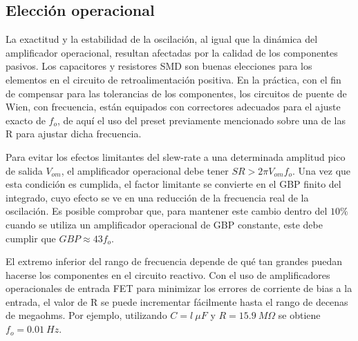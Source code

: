 \subsection{Elección operacional}
La exactitud y la estabilidad de la oscilación, al igual que la dinámica del amplificador operacional, resultan afectadas por la calidad de los componentes pasivos. Los capacitores y resistores SMD son buenas elecciones para los elementos en el circuito de retroalimentación positiva. En la práctica, con el fin de compensar para las tolerancias de los componentes, los circuitos de puente de Wien, con frecuencia, están equipados con correctores adecuados para el ajuste exacto de $f_o$, de aquí el uso del preset previamente mencionado sobre una de las R para ajustar dicha frecuencia.

Para evitar los efectos limitantes del slew-rate a una determinada amplitud pico de salida $V_{om}$, el amplificador operacional debe tener $SR > 2\pi V_{om} f_o$. Una vez que esta condición es cumplida, el factor limitante se convierte en el GBP finito del integrado, cuyo efecto se ve en una reducción de la frecuencia real de la oscilación. Es posible comprobar que, para mantener este cambio dentro del $10\%$ cuando se utiliza un amplificador operacional de GBP constante, este debe cumplir que $GBP \approx 43 f_o$.

El extremo inferior del rango de frecuencia depende de qué tan grandes puedan hacerse los componentes en el circuito reactivo. Con el uso de amplificadores operacionales de entrada FET para minimizar los errores de corriente de bias a la entrada, el valor de R se puede incrementar fácilmente hasta el rango de decenas de megaohms. Por ejemplo, utilizando $C = l \ \mu F$ y $R = 15.9 \ M\Omega$ se obtiene $f_o =0.01 \ Hz$.

